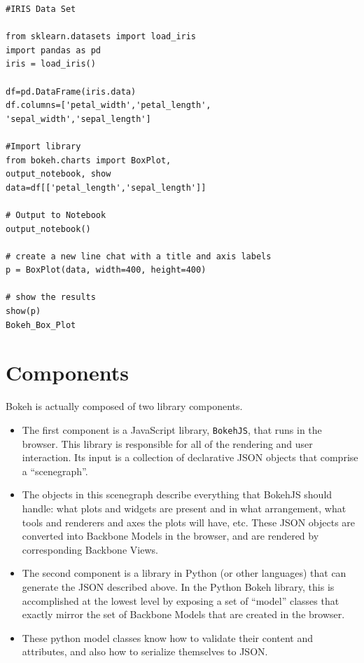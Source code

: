 \documentclass[a4paper,12pt]{article}
\begin{document}
\newpage


\begin{verbatim}
#IRIS Data Set

from sklearn.datasets import load_iris
import pandas as pd
iris = load_iris()

df=pd.DataFrame(iris.data)
df.columns=['petal_width','petal_length',
'sepal_width','sepal_length']

#Import library
from bokeh.charts import BoxPlot,   
output_notebook, show
data=df[['petal_length','sepal_length']]

# Output to Notebook
output_notebook()

# create a new line chat with a title and axis labels
p = BoxPlot(data, width=400, height=400)

# show the results
show(p)
Bokeh_Box_Plot
\end{verbatim}


\section*{Components}
\Large

Bokeh is actually composed of two library components.

\begin{itemize}
	\item The first component is a JavaScript library, \texttt{BokehJS}, that runs in the browser. This library is responsible for all of the rendering and user interaction. Its input is a collection of declarative JSON objects that comprise a “scenegraph”. 
	\item The objects in this scenegraph describe everything that BokehJS should handle: what plots and widgets are present and in what arrangement, what tools and renderers and axes the plots will have, etc. These JSON objects are converted into Backbone Models in the browser, and are rendered by corresponding Backbone Views.
	
	\item The second component is a library in Python (or other languages) that can generate the JSON described above. In the Python Bokeh library, this is accomplished at the lowest level by exposing a set of “model” classes that exactly mirror the set of Backbone Models that are created in the browser. 
	\item These python model classes know how to validate their content and attributes, and also how to serialize themselves to JSON. 
	
\end{itemize}
\newpage
\end{document}
